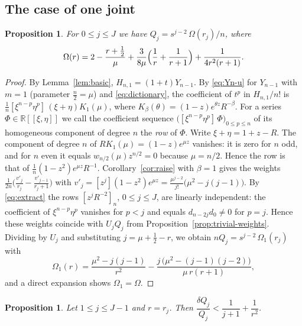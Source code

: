 \documentclass[11pt]{amsart}
\newtheorem{proposition}[theorem]{Proposition}
\theoremstyle{definition}
\theoremstyle{remark}
\numberwithin{equation}{section}
\begin{document}
\subsection{The case of one joint}

\begin{proposition}\label{prop:coloop}
For $0\le j\le J$ we have $Q_j=s^{j-2}\,\Omega(r_j)/n$, where
\[
\Omega(r)=2-\frac{r+\frac12}{\mu}+\frac3{8\mu}\Bigl(\frac1r+\frac1{r+1}\Bigr)+\frac1{4r^2(r+1)}.
\]
\end{proposition}

\begin{proof}
By Lemma~\ref{lem:basic}, $H_{n,1}=(1+t)Y_{n-1}$. By \eqref{eq:Yn-u} for $Y_{n-1}$ with $m=1$ (parameter $\frac n2=\mu$) and \eqref{eq:dictionary}, the coefficient of $t^p$ in $H_{n,1}/n!$ is $\frac1n[\xi^{n-p}\eta^p]\,(\xi+\eta)K_1(\mu)$, where $K_\beta(\theta)=(1-z)e^{\theta z}R^{-\beta}$. For a series $\Phi\in\mathbb{R}[[\xi,\eta]]$ we call the coefficient sequence $\bigl([\xi^{n-p}\eta^p]\,\Phi\bigr)_{0\le p\le n}$ of its homogeneous component of degree $n$ the \emph{row} of $\Phi$. Write $\xi+\eta=1+z-R$. The component of degree $n$ of $RK_1(\mu)=(1-z)e^{\mu z}$ vanishes: it is zero for $n$ odd, and for $n$ even it equals $w_{n/2}(\mu)z^{n/2}=0$ because $\mu=n/2$. Hence the row is that of $\frac1n(1-z^2)e^{\mu z}R^{-1}$. Corollary~\ref{cor:raise} with $\beta=1$ gives the weights $\frac1{2n}\bigl(\frac{v'_j}{r_j}-\frac{v'_{j-1}}{r_j+1}\bigr)$ with $v'_j=[z^j](1-z^2)e^{\mu z}=\frac{\mu^{j-2}}{j!}\bigl(\mu^2-j(j-1)\bigr)$. By \eqref{eq:extract} the rows $[z^jR^{-2}]_n$, $0\le j\le J$, are linearly independent: the coefficient of $\xi^{n-p}\eta^p$ vanishes for $p<j$ and equals $d_{n-2j}d_0\neq0$ for $p=j$. Hence these weights coincide with $U_jQ_j$ from Proposition~\ref{prop:trivial-weights}. Dividing by $U_j$ and substituting $j=\mu+\frac12-r$, we obtain $nQ_j=s^{j-2}\,\Omega_1(r_j)$ with
\[
\Omega_1(r)=\frac{\mu^2-j(j-1)}{r^2}-\frac{j\,\bigl(\mu^2-(j-1)(j-2)\bigr)}{\mu\,r(r+1)},
\]
and a direct expansion shows $\Omega_1=\Omega$.
\end{proof}

\begin{proposition}\label{prop:coloop-curvature}
Let $1\le j\le J-1$ and $r=r_j$. Then $\dfrac{\delta Q_j}{Q_j}<\dfrac1{j+1}+\dfrac1{r^2}$.
\end{proposition}
\end{document}
